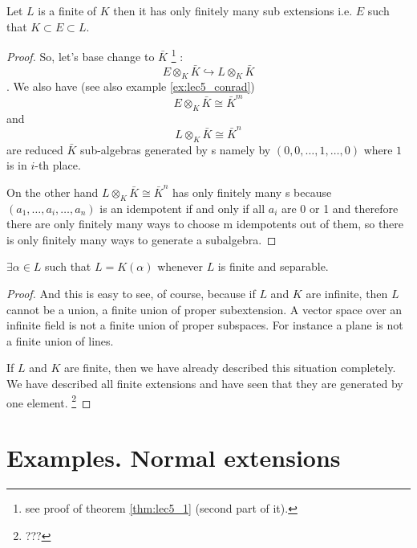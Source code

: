 \begin{theorem}
  Let $L$ is a finite  of $K$ then it
  has only finitely many sub extensions i.e. $E$ such that $K \subset
  E \subset L$.
  \begin{proof}
    So, let's base change to $\bar{K}$
    \footnote {
      see proof of theorem \ref{thm:lec5_1} (second part of it).
    }  
    :
    \[
    E \otimes_{K} \bar{K} \hookrightarrow
    L \otimes_{K} \bar{K}
    \].
    We also have (see also example \ref{ex:lec5_conrad})
    \[
    E \otimes_{K} \bar{K} \cong \bar{K}^m
    \]
    and
    \[
    L \otimes_{K} \bar{K} \cong \bar{K}^n
    \]
    are reduced $\bar{K}$ sub-algebras generated by
    s namely by
    $\left(0,0, \dots, 1, \dots, 0\right)$ where $1$ is in $i$-th
    place.

    On the other hand $L \otimes_K \bar{K} \cong \bar{K}^n$ has only
    finitely many s because 
    $\left(a_1, \dots, a_i, \dots, a_n\right)$ is an idempotent if and
    only if all $a_i$ are 0 or 1 and therefore there
    are only finitely many ways to choose m idempotents out of them,
    so there is only finitely many ways to generate a subalgebra.  
  \end{proof}
  \label{thm:primitiveelement}
\end{theorem}

\begin{corollary}
  $\exists \alpha \in L$ such that $L = K\left( \alpha \right)$
  whenever $L$ is finite and separable.
  \begin{proof}
    And this is easy to see, of course, because
    if $L$ and $K$ are infinite, then 
    $L$ cannot be a union, a finite union of proper subextension. 
    A vector space over an infinite field is not a finite union of
    proper subspaces.   For instance a plane is not a finite union of
    lines.
    
    If $L$ and $K$ are finite, then we have  already described this
    situation completely. We have described all finite extensions  
    and have seen that they are generated by one element.
    \footnote{???}
  \end{proof}
  \label{col:primitiveelement}
\end{corollary}

\section{Examples. Normal extensions}

